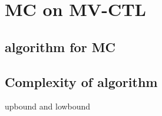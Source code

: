 \section{MC on MV-CTL }

\subsection{algorithm for MC }
\subsection{Complexity of algorithm}
 upbound and lowbound 